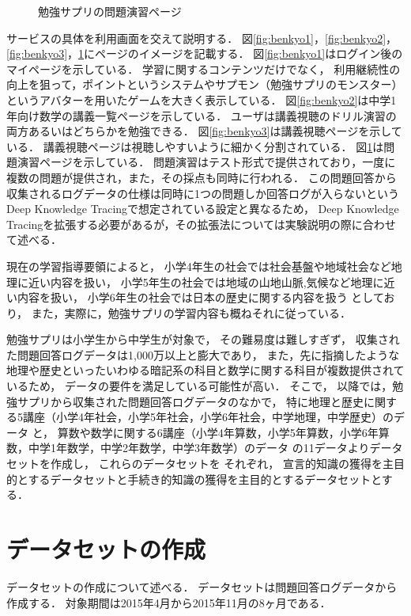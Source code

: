 \begin{figure}[!htb]
\begin{center}
{			\caption{勉強サプリの問題演習ページ}
			\label{fig:benkyo4}
		\endminipage\hfill
	}
\end{center}
\end{figure}
サービスの具体を利用画面を交えて説明する．
図\ref{fig:benkyo1}，\ref{fig:benkyo2}，\ref{fig:benkyo3}，\ref{fig:benkyo4}にページのイメージを記載する．
図\ref{fig:benkyo1}はログイン後のマイページを示している．
学習に関するコンテンツだけでなく，
利用継続性の向上を狙って，ポイントというシステムやサプモン（勉強サプリのモンスター）というアバターを用いたゲームを大きく表示している．
図\ref{fig:benkyo2}は中学1年向け数学の講義一覧ページを示している．
ユーザは講義視聴のドリル演習の両方あるいはどちらかを勉強できる．
図\ref{fig:benkyo3}は講義視聴ページを示している．
講義視聴ページは視聴しやすいように細かく分割されている．
図\ref{fig:benkyo4}は問題演習ページを示している．
問題演習はテスト形式で提供されており，一度に複数の問題が提供され，また，その採点も同時に行われる．
この問題回答から収集されるログデータの仕様は同時に1つの問題しか回答ログが入らないというDeep Knowledge Tracingで想定されている設定と異なるため，
Deep Knowledge Tracingを拡張する必要があるが，その拡張法については実験説明の際に合わせて述べる．


現在の学習指導要領\cite{gakushushidouyouryou}によると，
小学4年生の社会では社会基盤や地域社会など地理に近い内容を扱い，
小学5年生の社会では地域の山地山脈,気候など地理に近い内容を扱い，
小学6年生の社会では日本の歴史に関する内容を扱う
としており，
また，実際に，勉強サプリの学習内容も概ねそれに従っている．


勉強サプリは小学生から中学生が対象で，
その難易度は難しすぎず，
収集された問題回答ログデータは1,000万以上と膨大であり，
また，先に指摘したような地理や歴史といったいわゆる暗記系の科目と数学に関する科目が複数提供されているため，
データの要件を満足している可能性が高い．
そこで，
以降では，勉強サプリから収集された問題回答ログデータのなかで，
特に地理と歴史に関する5講座（小学4年社会，小学5年社会，小学6年社会，中学地理，中学歴史）のデータ
と，
算数や数学に関する6講座（小学4年算数，小学5年算数，小学6年算数，中学1年数学，中学2年数学，中学3年数学）のデータ
の11データよりデータセットを作成し，
これらのデータセットを
それぞれ，
宣言的知識の獲得を主目的とするデータセットと手続き的知識の獲得を主目的とするデータセットとする．


\section{データセットの作成}
データセットの作成について述べる．
データセットは問題回答ログデータから作成する．
対象期間は2015年4月から2015年11月の8ヶ月である．

